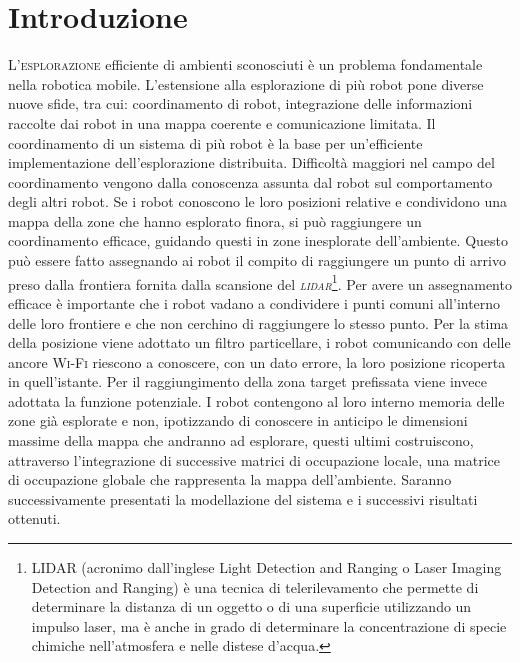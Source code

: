 \section{Introduzione}
\lettrine[lines=3]{L'}{esplorazione} efficiente di ambienti sconosciuti è un
problema fondamentale nella robotica mobile.
L'estensione alla esplorazione di più robot pone diverse nuove sfide, tra cui:
coordinamento di robot, integrazione delle informazioni raccolte dai robot in
una mappa coerente e comunicazione limitata.
Il coordinamento di un sistema di più robot è la base per un'efficiente
implementazione dell'esplorazione distribuita.
Difficoltà maggiori nel campo del coordinamento vengono dalla conoscenza
assunta dal robot sul comportamento degli altri robot.
Se i robot conoscono le loro posizioni relative e condividono una mappa della
zone che hanno esplorato finora, si può raggiungere un coordinamento efficace,
guidando questi in zone inesplorate dell'ambiente.
Questo può essere fatto assegnando ai robot il compito di raggiungere un punto
di arrivo preso dalla frontiera fornita dalla scansione del
\emph{\textsc{lidar}}\footnote{LIDAR (acronimo dall'inglese Light Detection and
Ranging o Laser Imaging Detection and Ranging) è una tecnica di
telerilevamento che permette di determinare la distanza di un oggetto o di una
superficie utilizzando un impulso laser, ma è anche in grado di determinare la
concentrazione di specie chimiche nell'atmosfera e nelle distese d'acqua.}.\cite{yamauchi1998frontier}
Per avere un assegnamento efficace è importante che i robot vadano a condividere
i punti comuni all'interno delle loro frontiere e che non cerchino di
raggiungere lo stesso punto.
Per la stima della posizione viene adottato un filtro particellare, i robot
comunicando con delle ancore \textsc{Wi-Fi} riescono a conoscere, con un dato
errore, la loro posizione ricoperta in quell'istante. Per il raggiungimento
della zona target prefissata viene invece adottata la funzione potenziale.
I robot contengono al loro interno memoria delle zone già esplorate e non,
ipotizzando di conoscere in anticipo le dimensioni massime della mappa che
andranno ad esplorare, questi ultimi costruiscono, attraverso l'integrazione di
successive matrici di occupazione locale, una matrice di occupazione globale
che rappresenta la mappa dell'ambiente.
Saranno successivamente presentati la modellazione del sistema e i successivi
risultati ottenuti.
